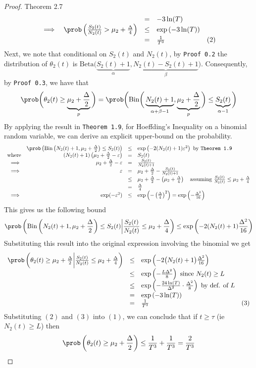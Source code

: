 \documentclass[11pt,a4paper]{article}
\begin{document}
\begin{proof}{Theorem 2.7}
\[\begin{array}{rrcll}
    &&=&-3\ln(T)\\
    \implies&\prob\left(\frac{S_2(t)}{N_2(t)}>\mu_2+\frac\Delta4\right)&\leq&\exp\left(-3\ln(T)\right)\\
    &&=&\frac1{T^3}&(2)
    \end{array}\]
    Next, we note that conditional on $S_2(t)$ and $N_2(t)$, by \texttt{Proof 0.2}  the distribution of $\theta_2(t)$ is ${\text{Beta}\big(\underbrace{S_2(t)+1}_\alpha,\underbrace{N_2(t)-S_2(t)+1}_\beta\big)}$. Consequently, by \texttt{Proof 0.3}, we have that
    \[ \prob\bigg(\theta_2(t)\geq\underbrace{\mu_2+\frac\Delta2}_p\bigg)=\prob\bigg(\text{Bin}\bigg(\underbrace{N_2(t)+1}_{\alpha+\beta-1},\underbrace{\mu_2+\frac\Delta2}_p\bigg)\leq \underbrace{S_2(t)}_{\alpha-1}\bigg) \]
    By applying the result in \texttt{Theorem 1.9}, for Hoeffding's Inequality on a binomial random variable, we can derive an explicit upper-bound on the probability.
    \[\begin{array}{rrcl}
      &\prob\left(\text{Bin}\left(N_2(t)+1,\mu_2+\frac\Delta2\right)\leq S_2(t)\right)&\leq& \exp\left(-2(N_2(t)+1)\varepsilon^2\right)\text{ by \texttt{Theorem 1.9}}\\
      \text{where}&\left(N_2(t)+1\right)\left(\mu_2+\frac\Delta2-\varepsilon\right)&=&S_2(t)\\
      \implies&\mu_2+\frac\Delta2-\varepsilon&=&\frac{S_2(t)}{N_2(t)+1}\\
      \implies&\varepsilon&=&\mu_2+\frac\Delta2-\frac{S_2(t)}{N_2(t)+1}\\
      &&\leq&\mu_2+\frac\Delta2-\left(\mu_2+\frac\Delta4\right)\quad\text{assuming }\frac{S_2(t)}{N_2(t)}\leq\mu_2+\frac\Delta4\\
      &&=&\frac\Delta4\\
      \implies&\exp(-\varepsilon^2)&\leq&\exp\left(-\left(\frac\Delta4\right)^2\right)=\exp\left(-\frac{\Delta^2}{16}\right)
    \end{array}\]
    This gives us the following bound
    \[ \prob\left(\text{Bin}\left(N_2(t)+1,\mu_2+\frac\Delta2\right)\leq S_2(t)\bigg|\frac{S_2(t)}{N_2(t)}\leq\mu_2+\frac\Delta4\right)\leq\exp\left(-2(N_2(t)+1)\frac{\Delta^2}{16}\right) \]
    Substituting this result into the original expression involving the binomial we get
    \[\begin{array}{rcll}
      \prob\left(\theta_2(t)\geq\mu_2+\frac\Delta2\bigg|\frac{S_2(t)}{N_2(t)}\leq\mu_2+\frac\Delta4\right)&\leq&\exp\left(-2\big(N_2(t)+1\big)\frac{\Delta^2}{16}\right)\\
      &\leq&\exp\left(-\frac{L\Delta^2}8\right)\text{ since }N_2(t)\geq L\\
      &\leq&\exp\left(-\frac{24\ln(T)}{\Delta^2}\cdot\frac{\Delta^2}8\right)\text{ by def. of }L\\
      &=&\exp\left(-3\ln(T)\right)\\
      &=&\frac1{T^3}&(3)
    \end{array}\]
    Substituting $(2)$ and $(3)$ into $(1)$, we can conclude that if $t\geq\tau$ (ie $N_2(t)\geq L$) then
    \[ \prob\left(\theta_2(t)\geq\mu_2+\frac\Delta2\right)\leq\frac1{T^3}+\frac1{T^3}=\frac2{T^3} \]


\end{proof}
\end{document}
